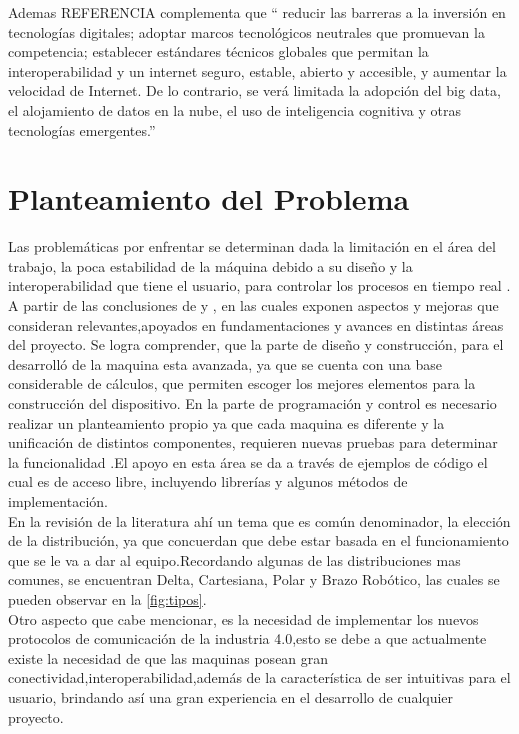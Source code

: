 Ademas \citep{}REFERENCIA complementa que “ reducir las barreras a la inversión en tecnologías digitales; adoptar marcos tecnológicos neutrales que promuevan la competencia; establecer estándares técnicos globales que permitan la interoperabilidad y un internet seguro, estable, abierto y accesible, y aumentar la velocidad de Internet. De lo contrario, se verá limitada la adopción del big data, el alojamiento de datos en la nube, el uso de inteligencia cognitiva y otras tecnologías emergentes.''\\

\newpage
\section{Planteamiento del Problema}\label{planteamiento}

Las problemáticas por enfrentar se determinan dada la limitación en el área del trabajo, la poca estabilidad de la máquina debido a su diseño y la interoperabilidad que tiene el usuario, para controlar los procesos en tiempo real . \\

A partir de las conclusiones de \citep{rodriguez} y \citep{fernandez}, en las cuales exponen aspectos y mejoras que consideran relevantes,apoyados en fundamentaciones y avances en distintas áreas del proyecto. Se logra comprender, que la parte de diseño y construcción, para el desarrolló de la maquina esta avanzada, ya que se cuenta con una base considerable de cálculos, que permiten escoger los mejores elementos para la construcción del dispositivo. En la parte de programación y control es necesario realizar un planteamiento propio ya que cada maquina es diferente y la unificación de distintos componentes, requieren nuevas pruebas para determinar la funcionalidad .El apoyo en esta área se da a través de ejemplos de código el cual es de acceso libre, incluyendo librerías y algunos métodos de implementación.\\ 

En la revisión de la literatura ahí un tema que es común denominador, la elección de la distribución, ya que concuerdan que debe estar basada en el funcionamiento que se le va a dar al equipo.Recordando algunas de las distribuciones mas comunes, se encuentran Delta, Cartesiana, Polar y Brazo Robótico, las cuales se pueden observar en la \autoref{fig:tipos}.\\

Otro aspecto que cabe mencionar, es la necesidad de implementar los nuevos protocolos de comunicación de la industria 4.0,esto se debe a que actualmente existe la necesidad de que las maquinas posean  gran conectividad,interoperabilidad,además de la característica de ser intuitivas para el usuario, brindando así una gran experiencia en el desarrollo de cualquier proyecto.\\

